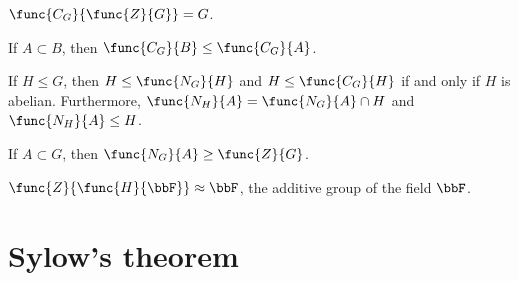 \begin{proposition}
    \(\func{C_G}{\func{Z}{G}} = G\).
\end{proposition}

\begin{proposition}
    If \(A \subset B\), then \(\func{C_G}{B} \leq \func{C_G}{A}\).
\end{proposition}
\begin{proposition}
    If \(H \leq G\), then \(H \leq \func{N_G}{H}\) and \(H \leq \func{C_G}{H}\) if and only if \(H\) is abelian. Furthermore, \(\func{N_H}{A} =\func{N_G}{A} \cap H\) and \(\func{N_H}{A} \leq H\).
\end{proposition}

\begin{proposition}
    If \(A \subset G\), then \(\func{N_G}{A} \geq \func{Z}{G}\).
\end{proposition}

\begin{proposition}
    \(\func{Z}{\func{H}{\bbF}} \approx \bbF\), the additive group of the field \(\bbF\).
\end{proposition}

\section{Sylow's theorem}



